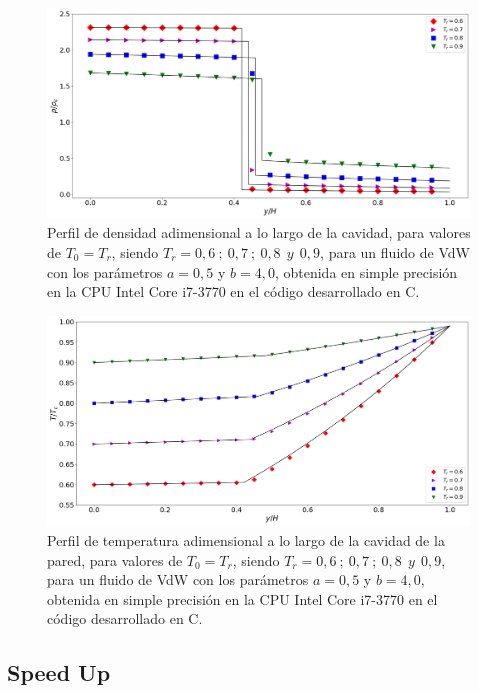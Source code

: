 \begin{figure}[h!]
	\centering
	\includegraphics[width=\textwidth]{figs/cap4/v_760_VdW_c_simple_rho_y}
	\caption{Perfil de densidad adimensional a lo largo de la cavidad, para valores de $T_0 = T_r$, siendo $T_r = 0,6\> ;\> 0,7\> ;\> 0,8\>\> y\>\> 0,9$, para un fluido de VdW con los parámetros $a = 0,5 $ y $b = 4,0 $, obtenida en simple precisión en la CPU Intel Core i7-3770 en el código desarrollado en \textsc{C}.}
	\label{fig:v_760_VdW_c_simple_rho_y}	
\end{figure}

\begin{figure}[h!]
	\centering
	\includegraphics[width=\textwidth]{figs/cap4/v_760_VdW_c_simple_T_y}
	\caption{Perfil de temperatura adimensional a lo largo de la cavidad de la pared, para valores de $T_0 = T_r$, siendo $T_r = 0,6\> ;\> 0,7\> ;\> 0,8\>\> y\>\> 0,9$, para un fluido de VdW con los parámetros $a = 0,5 $ y $b = 4,0 $, obtenida en simple precisión en la CPU Intel Core i7-3770 en el código desarrollado en \textsc{C}.}
	\label{fig:v_760_VdW_c_simple_T_y}	
\end{figure}

\newpage

\subsection{Speed Up}

